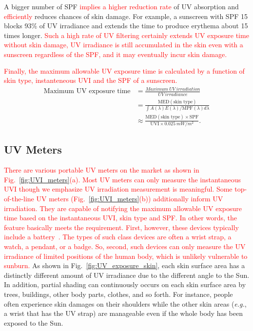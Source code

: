 \documentclass[journal]{IEEEtran}
\begin{document}
A bigger number of SPF \textcolor{red}{implies a higher reduction rate} of UV absorption and \textcolor{red}{efficiently} reduces chances of skin damage. For example, a sunscreen with SPF 15 blocks 93\% of UV irradiance and extends the time to produce erythema about 15 times longer. \textcolor{red}{Such a high rate of UV filtering certainly extends UV exposure time without skin damage, UV irradiance is still accumulated in the skin even with a sunscreen regardless of the SPF, and it may eventually incur skin damage.}

\textcolor{red}{Finally, the maximum allowable UV exposure time is calculated by a function of skin type, instanteneous UVI and the SPF of a sunscreen.} 
\begin{equation} \label{eq: max_exp_time}
\begin{split}
\text{Maximum~UV~exposure~time}
&= \frac{Maximum~UV~irradiation}{UV~irradiance} \\
&= \frac{\text{MED}(\text{skin~type})}{\int A(\lambda)E(\lambda)  / \text{MPF}(\lambda) d \lambda} \\
&\approx \frac{\text{MED}(\text{skin~type})\times \text{SPF}}{\text{UVI} \times 0.025~mW/m^2}.
\end{split}
\end{equation}


\subsection{UV Meters}
\textcolor{red}{There are various portable UV meters on the market as shown in Fig.~\ref{fig:UVI_meters}(a). Most UV meters can only measure the instantaneous UVI though we emphasize UV irradiation measurement is meaningful. Some top-of-the-line UV meters (Fig.~\ref{fig:UVI_meters}(b)) additionally inform UV irradiation. They are capable of notifying the maximum allowable UV exposure time based on the instantaneous UVI, skin type and SPF. In other words, the feature basically meets the requirement.  First, however, these devices typically include a battery~\cite{Netatmo, Ultra}. The types of such class devices are often a wrist strap, a watch, a pendant, or a badge. So, second, such devices can only measure the UV irradiance of limited positions of the human body, which is unlikely vulnerable to sunburn.} 
%
As shown in Fig.~\ref{fig:UV_exposure_skin}, each skin surface area has a distinctly different amount of UV irradiance due to the different angle to the Sun. In addition, partial shading can continuously occurs on each skin surface area by trees, buildings, other body parts, clothes, and so forth. For instance, people often experience skin damages on their shoulders while the other skin areas (\textit{e.g.}, a wrist that has the UV strap) are manageable even if the whole body has been exposed to the Sun.
\end{document}
